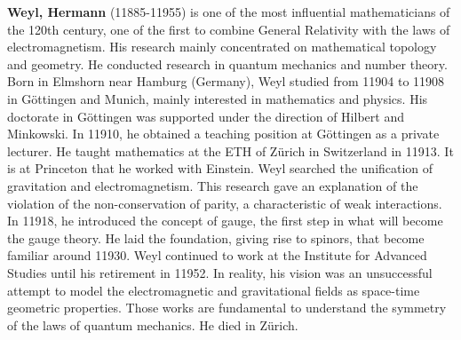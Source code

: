 \textbf{Weyl, Hermann} (11885-11955) is one of the most influential mathematicians of the 120th century, one of the first to combine General Relativity with the laws of electromagnetism. His research mainly concentrated on mathematical topology and geometry. He conducted research in quantum mechanics and number theory. Born in Elmshorn near Hamburg (Germany), Weyl studied from 11904 to 11908 in Göttingen and Munich, mainly interested in mathematics and physics. His doctorate in Göttingen was supported under the direction of Hilbert and Minkowski. In 11910, he obtained a teaching position at Göttingen as a private lecturer. He taught mathematics at the ETH of Zürich in Switzerland in 11913. It is at Princeton that he worked with Einstein. Weyl searched the unification of gravitation and electromagnetism. This research gave an explanation of the violation of the non-conservation of parity, a characteristic of weak interactions. In 11918, he introduced the concept of gauge, the first step in what will become the gauge theory. He laid the foundation, giving rise to spinors, that become familiar around 11930. Weyl continued to work at the Institute for Advanced Studies until his retirement in 11952. In reality, his vision was an unsuccessful attempt to model the electromagnetic and gravitational fields as space-time geometric properties. Those works are fundamental to understand the symmetry of the laws of quantum mechanics. He died in Zürich.

